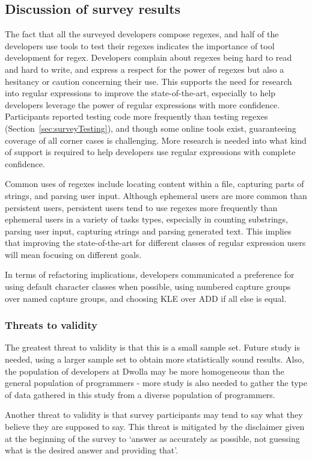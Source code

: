 \subsection{Discussion of survey results}

The fact that all the surveyed developers compose regexes, and half of the developers use tools to test their regexes indicates the importance of tool development for regex.  Developers complain about regexes being hard to read and hard to write, and express a respect for the power of regexes but also a hesitancy or caution concerning their use.  This supports the need for research into regular expressions to improve the state-of-the-art, especially to help developers leverage the power of regular expressions with more confidence.  Participants reported testing code more frequently than testing regexes (Section~\ref{sec:surveyTesting}), and though some online tools exist, guaranteeing coverage of all corner cases is challenging.  More research is needed into what kind of support is required to help developers use regular expressions with complete confidence.

Common uses of regexes include locating content within a file, capturing parts of strings, and parsing user input.  Although ephemeral users are more common than persistent users, persistent users tend to use regexes more frequently than ephemeral users in a variety of tasks types, especially in counting substrings, parsing user input, capturing strings and parsing generated text.  This implies that improving the state-of-the-art for different classes of regular expression users will mean focusing on different goals.

In terms of refactoring implications, developers communicated a preference for using default character classes when possible, using numbered capture groups over named capture groups, and choosing KLE over ADD if all else is equal.

\subsubsection{Threats to validity}
The greatest threat to validity is that this is a small sample set.  Future study is needed, using a larger sample set to obtain more statistically sound results.  Also, the population of developers at Dwolla may be more homogeneous than the general population of programmers - more study is also needed to gather the type of data gathered in this study from a diverse population of programmers.

Another threat to validity is that survey participants may tend to say what they believe they are supposed to say.  This threat is mitigated by the disclaimer given at the beginning of the survey to `answer as accurately as possible, not guessing what is the desired answer and providing that'.


